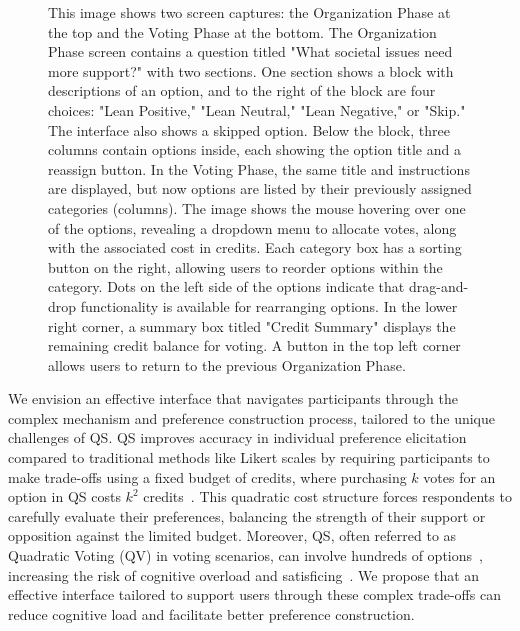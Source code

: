\begin{figure}[ht]
{    This image shows two screen captures: the Organization Phase at the top and the Voting Phase at the bottom. The Organization Phase screen contains a question titled "What societal issues need more support?" with two sections. One section shows a block with descriptions of an option, and to the right of the block are four choices: "Lean Positive," "Lean Neutral," "Lean Negative," or "Skip." The interface also shows a skipped option. Below the block, three columns contain options inside, each showing the option title and a reassign button. In the Voting Phase, the same title and instructions are displayed, but now options are listed by their previously assigned categories (columns). The image shows the mouse hovering over one of the options, revealing a dropdown menu to allocate votes, along with the associated cost in credits. Each category box has a sorting button on the right, allowing users to reorder options within the category. Dots on the left side of the options indicate that drag-and-drop functionality is available for rearranging options. In the lower right corner, a summary box titled "Credit Summary" displays the remaining credit balance for voting. A button in the top left corner allows users to return to the previous Organization Phase.
    }

\end{figure}

We envision an effective interface that navigates participants through the complex mechanism and preference construction process, tailored to the unique challenges of QS. QS improves accuracy in individual preference elicitation compared to traditional methods like Likert scales by requiring participants to make trade-offs using a fixed budget of credits, where purchasing $k$ votes for an option in QS costs $k^2$ credits~\cite{quarfoot2017quadratic,chengCanShowWhat2021}. This quadratic cost structure forces respondents to carefully evaluate their preferences, balancing the strength of their support or opposition against the limited budget.  Moreover, QS, often referred to as Quadratic Voting (QV) in voting scenarios, can involve hundreds of options~\cite{rogersColoradoTriedNew2019, teamTaiwanDigitalMinister}, increasing the risk of cognitive overload and satisficing~\cite{simonBehavioralModelRational1955, payneAdaptiveStrategySelection1988, tverskyJudgmentsRepresentativeness}. We propose that an effective interface tailored to support users through these complex trade-offs can reduce cognitive load and facilitate better preference construction.

